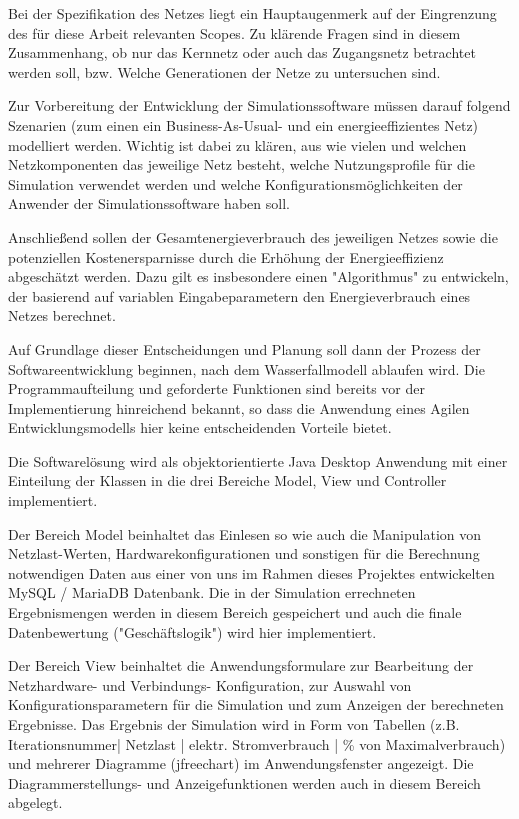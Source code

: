 \documentclass[12pt,titlepage]{article}
\begin{document}
Bei der Spezifikation des Netzes liegt ein Hauptaugenmerk auf der Eingrenzung des für diese Arbeit relevanten Scopes. Zu klärende Fragen sind in diesem Zusammenhang, ob nur das Kernnetz oder auch das Zugangsnetz betrachtet werden soll, bzw. Welche Generationen der Netze zu untersuchen sind. 
 
Zur Vorbereitung der Entwicklung der Simulationssoftware müssen darauf folgend Szenarien (zum einen ein Business-As-Usual- und ein energieeffizientes Netz) modelliert werden. Wichtig ist dabei zu klären, aus wie vielen und welchen Netzkomponenten das jeweilige Netz besteht, welche Nutzungsprofile für die Simulation verwendet werden und welche Konfigurationsmöglichkeiten der Anwender der Simulationssoftware haben soll. 
 
Anschließend sollen der Gesamtenergieverbrauch des jeweiligen Netzes sowie die potenziellen Kostenersparnisse durch die Erhöhung der Energieeffizienz abgeschätzt werden. Dazu gilt es insbesondere einen "Algorithmus" zu entwickeln, der basierend auf variablen Eingabeparametern den Energieverbrauch eines Netzes berechnet. 
 
Auf Grundlage dieser Entscheidungen und Planung soll dann der Prozess der Softwareentwicklung beginnen, nach dem Wasserfallmodell ablaufen wird. Die Programmaufteilung und geforderte Funktionen sind bereits vor der Implementierung hinreichend bekannt, so dass die Anwendung eines Agilen Entwicklungsmodells hier keine entscheidenden Vorteile bietet.
 
Die Softwarelösung wird als objektorientierte Java Desktop Anwendung mit einer Einteilung der Klassen in die drei Bereiche Model, View und Controller implementiert.
 
Der Bereich Model beinhaltet das Einlesen so wie auch die Manipulation von Netzlast-Werten, Hardwarekonfigurationen und sonstigen für die Berechnung notwendigen Daten aus einer von uns im Rahmen dieses Projektes entwickelten MySQL / MariaDB Datenbank. Die in der Simulation errechneten Ergebnismengen werden in diesem Bereich gespeichert und auch die finale Datenbewertung ("Geschäftslogik") wird hier implementiert.
 
Der Bereich View beinhaltet die Anwendungsformulare zur Bearbeitung der Netzhardware- und Verbindungs- Konfiguration, zur Auswahl von Konfigurationsparametern für die Simulation und zum Anzeigen der berechneten Ergebnisse. Das Ergebnis der Simulation wird in Form von Tabellen (z.B. Iterationsnummer| Netzlast | elektr. Stromverbrauch | \% von Maximalverbrauch) und mehrerer Diagramme (jfreechart) im Anwendungsfenster angezeigt. Die Diagrammerstellungs- und Anzeigefunktionen werden auch in diesem Bereich abgelegt.
 
\end{document}
